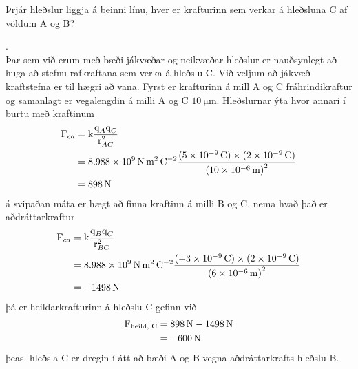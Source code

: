 \begin{formalexample}
	Þrjár hleðslur liggja á beinni línu, hver er krafturinn sem verkar
	á hleðsluna C af völdum A og B?
	\begin{center}
	\end{center}
	.
	\\[4 ex]
	Þar sem við erum með bæði jákvæðar og neikvæðar hleðslur er nauðsynlegt
	að huga að stefnu rafkraftana sem verka á hleðslu C. Við veljum að jákvæð
	kraftstefna er til hægri að vana. Fyrst er krafturinn
	á mill A og C fráhrindikraftur og samanlagt er vegalengdin á milli A og C
	$\SI{10}{\micro\meter}$. Hleðslurnar ýta hvor annari í burtu með kraftinum
	\begin{align*}
		\uforce_{ca} &=
			\uconstk \frac{\uchargeq_A \uchargeq_C}{\ulengthr_{AC}^2} \\
			&= \ucoulombconstantenmc
				\frac{
					(\SI{5e-9}{\coulomb}) 
					\times (\SI{2e-9}{\coulomb})
					}{\left( \SI{10e-6}{\meter} \right)^2} \\
			&= \SI{898}{\N}
	\end{align*}
	á svipaðan máta er hægt að finna kraftinn á milli B og C, nema hvað það
	er aðdráttarkraftur
	\begin{align*}
		\uforce_{ca} &=
			\uconstk \frac{\uchargeq_B \uchargeq_C}{\ulengthr_{BC}^2} \\
			&= \ucoulombconstantenmc
				\frac{
					(\SI{-3e-9}{\coulomb}) 
					\times (\SI{2e-9}{\coulomb})
					}{\left( \SI{6e-6}{\meter} \right)^2} \\
			&= \SI{-1498}{\N}
	\end{align*}
	þá er heildarkrafturinn á hleðslu C gefinn við 
	\begin{align*}
		\uforce_\text{heild, C} &= \SI{898}{\N} - \SI{1498}{\N} \\
			&= \SI{-600}{\N}
	\end{align*}
	þeas. hleðsla C er dregin í átt að bæði A og B vegna aðdráttarkrafts
	hleðslu B.
\end{formalexample}

